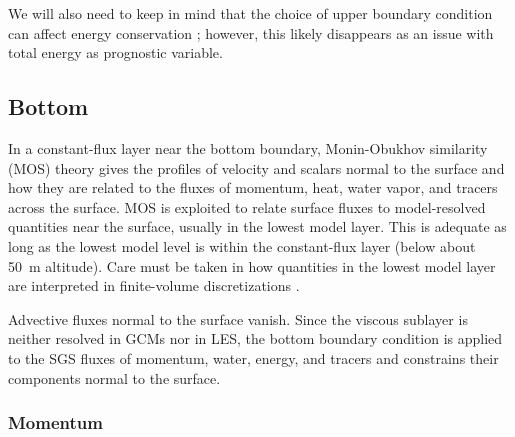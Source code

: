\documentclass{article}
\begin{document}
We will also need to keep in mind that the choice of upper boundary condition can affect energy conservation \citep[e.g.,][]{Staniforth03a}; however, this likely disappears as an issue with total energy as prognostic variable.

\subsection{Bottom} 
\label{s:bottom_bc}
In a constant-flux layer near the bottom boundary, Monin-Obukhov similarity (MOS) theory gives the profiles of velocity and scalars normal to the surface and how they are related to the fluxes of momentum, heat, water vapor, and tracers across the surface. MOS is exploited to relate surface fluxes to model-resolved quantities near the surface, usually in the lowest model layer. This is adequate as long as the lowest model level is within the constant-flux layer (below about 50~m altitude). Care must be taken in how quantities in the lowest model layer are interpreted in finite-volume discretizations  \citep{Nishizawa18a}.

Advective fluxes normal to the surface vanish. Since the viscous sublayer is neither resolved in GCMs nor in LES, the bottom boundary condition is applied to the SGS fluxes of momentum, water, energy, and tracers and constrains their components normal to the surface. 

\subsubsection{Momentum}
\end{document}
